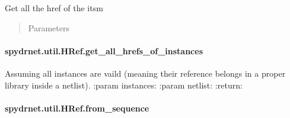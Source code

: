 \documentclass[letterpaper,10pt,english,openany,oneside]{sphinxmanual}
\begin{document}
\begin{fulllineitems}
\label{\detokenize{reference/classes/generated/spydrnet.util.HRef.get_all_hrefs_of_item:spydrnet.util.HRef.get_all_hrefs_of_item}}
Get all the href of the itsm
\begin{quote}\begin{description}
\item[{Parameters}] \leavevmode
{}

\end{description}\end{quote}

\end{fulllineitems}



\paragraph{spydrnet.util.HRef.get\_all\_hrefs\_of\_instances}
\label{\detokenize{reference/classes/generated/spydrnet.util.HRef.get_all_hrefs_of_instances:spydrnet-util-href-get-all-hrefs-of-instances}}\label{\detokenize{reference/classes/generated/spydrnet.util.HRef.get_all_hrefs_of_instances::doc}}

\begin{fulllineitems}
\label{\detokenize{reference/classes/generated/spydrnet.util.HRef.get_all_hrefs_of_instances:spydrnet.util.HRef.get_all_hrefs_of_instances}}
Assuming all instances are vaild (meaning their reference belongs in a proper library inside a netlist).
:param instances:
:param netlist:
:return:

\end{fulllineitems}



\paragraph{spydrnet.util.HRef.from\_sequence}
\label{\detokenize{reference/classes/generated/spydrnet.util.HRef.from_sequence:spydrnet-util-href-from-sequence}}\label{\detokenize{reference/classes/generated/spydrnet.util.HRef.from_sequence::doc}}
\end{document}
